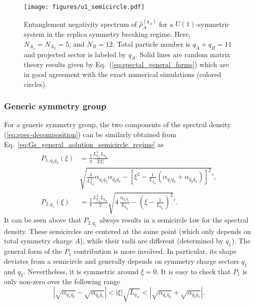 \documentclass[aps,pra,reprint,superscriptaddress,twocolumn,notitlepage]{revtex4-1}
\numberwithin{equation}{section}
\begin{document}
\begin{figure*}
    \centering
    \texttt{[image: figures/u1\_semicircle.pdf]}
    \caption{Entanglement negativity spectrum of $\hat \rho_A^{(q_A)}$ for a $U(1)$-symmetric system in the replica symmetry breaking regime. Here, $N_{A_1}=N_{A_2}=5$, and $N_B=12$. Total particle number is $q_A+q_B=11$ and projected sector is labeled by $q_A$. Solid lines are random matrix theory results given by Eq.~(\ref{eq:spectal_general_forms}) which are in good agreement with the exact numerical simulations (colored circles). }
    \label{fig:u1-semicircle}
\end{figure*}

\subsubsection{Generic symmetry group}
For a generic symmetry group,  the two components of the spectral density (\ref{eq:spec-decomposition}) can be similarly obtained from Eq.~\eqref{eq:Gs_general_aolution_semicircle_regime} as
\begin{equation}\label{eq:spectal_general_forms}
\begin{aligned}
    P_{1,q_1q_2}(\xi) & = \frac{1}{\pi} \frac{L_{q_A}^2 L_{q_B} }{2 \left|\xi \right|} \\
    &\sqrt{ \frac{4}{L_{q_A}^2}  \alpha_{q_1q_2}  \alpha_{\bar{q}_2 \bar{q}_1}  - \left[ \xi^2  - \frac{1}{L_{q_A}}  \left(  \alpha_{q_1q_2} + \alpha_{\bar{q}_2 \bar{q}_1} \right) \right]^2  }',\\
    P_{2,q_1}(\xi) & =  \frac{1}{\pi} \frac{L_{q_A}^2 L_{q_B} }{2} \sqrt{4 \, \frac{\alpha_{q_1 \bar{q}_1} }{L_{q_A}}  - \left( \xi - \frac1{L_{q_A}}  \right)^2 }' .
\end{aligned}    
\end{equation}
It can be seen above that $P_{2,q_1}$ always results in a semicircle law for the spectral density. These semicircles are centered at the same point (which only depends on total symmetry charge $A$), while their radii are different (determined by $q_1$). The general form of the $P_1$ contribution is more involved. In particular, its shape deviates from a semicircle and generally depends on symmetry charge sectors $q_1$ and $q_2$. Nevertheless, it is symmetric around $\xi = 0$. 
It is easy to check that $P_1$ is only non-zero over the following range 
\begin{equation}
    \left| \sqrt{\alpha_{q_1 q_2}} - \sqrt{\alpha_{\bar{q}_2 \bar{q}_1}} \right|  < \left| \xi \right| \sqrt{L_{q_A}}  <   \left| \sqrt{\alpha_{q_1 q_2}} + \sqrt{\alpha_{\bar{q}_2 \bar{q}_1}} \right|.
\end{equation} 
\end{document}

